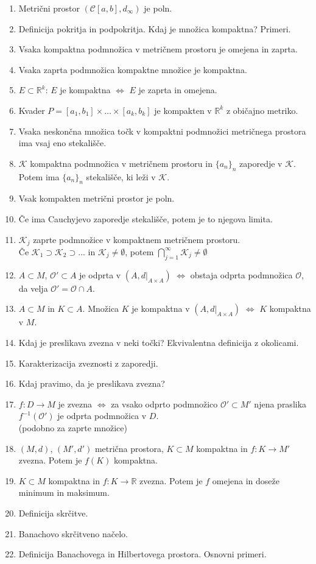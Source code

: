 \documentclass[a4paper,12pt]{report}
\begin{document}
\begin{enumerate}
    \item Metrični prostor $(\mathcal{C}[a, b], d_{\infty})$ je poln.
    \item Definicija pokritja in podpokritja. Kdaj je množica kompaktna? Primeri.
    \item Vsaka kompaktna podmnožica v metričnem prostoru je omejena in zaprta.
    \item Vsaka zaprta podmnožica kompaktne množice je kompaktna.
    \item $E \subset \mathbb{R}^k$: $E$ je kompaktna $\iff$ $E$ je zaprta in omejena.
    \item Kvader $P = [a_1, b_1] \times \dots \times [a_k, b_k]$ je kompakten v $\mathbb{R}^k$ z običajno metriko.
    \item Vsaka neskončna množica točk v kompaktni podmnožici metričnega prostora ima vsaj eno stekališče.
    \item $\mathcal{K}$ kompaktna podmnožica v metričnem prostoru in $\{a_n\}_n$ zaporedje v $\mathcal{K}$. Potem ima $\{a_n\}_n$ stekališče, ki leži v $\mathcal{K}$.
    \item Vsak kompakten metrični prostor je poln.
    \item Če ima Cauchyjevo zaporedje stekališče, potem je to njegova limita.
    \item $\mathcal{K}_j$ zaprte podmnožice v kompaktnem metričnem prostoru. \\ Če $\mathcal{K}_1 \supset \mathcal{K}_2 \supset \dots$ in $\mathcal{K}_j \neq \emptyset$, potem $\bigcap\limits_{j=1}^{\infty} \mathcal{K}_j \neq \emptyset$
    \item $A \subset M$, $\mathcal{O}' \subset A$ je odprta v $(A, d|_{A \times A})$ $\iff$ obstaja odprta podmnožica $\mathcal{O}$, da velja $\mathcal{O}' = \mathcal{O} \cap A$.
    \item $A \subset M$ in $K \subset A$. Množica $K$ je kompaktna v $(A, d|_{A \times A})$ $\iff$ $K$ kompaktna v $M$.
    \item Kdaj je preslikava zvezna v neki točki? Ekvivalentna definicija z okolicami.
    \item Karakterizacija zveznosti z zaporedji.
    \item Kdaj pravimo, da je preslikava zvezna?
    \item $f: D \to M$ je zvezna $\iff$ za vsako odprto podmnožico $\mathcal{O}' \subset M'$ njena praslika $f^{-1}(\mathcal{O}')$ je odprta podmnožica v $D$. \\ (podobno za zaprte množice)
    \item $(M, d)$, $(M', d')$ metrična prostora, $K \subset M$ kompaktna in $f: K \to M'$ zvezna. Potem je $f(K)$ kompaktna.
    \item $K \subset M$ kompaktna in $f: K \to \mathbb{R}$ zvezna. Potem je $f$ omejena in doseže minimum in maksimum.
    \item Definicija skrčitve.
    \item Banachovo skrčitveno načelo.
    \item Definicija Banachovega in Hilbertovega prostora. Osnovni primeri.
\end{enumerate}
\end{document}
